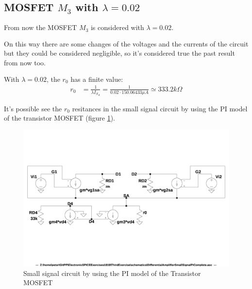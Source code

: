 \documentclass[10pt,a4paper]{book}
\begin{document}
\subsection{MOSFET $M_3$ with $\lambda = 0.02$}
From now the MOSFET $M_3$ is considered with $\lambda = 0.02$.\par
On this way there are some changes of the voltages and the currents of the circuit but they could be considered negligible, so it's considered true the past result from now too.\par
With $\lambda = 0.02$, the $r_0$ has a finite value:\\
\begin{align}
r_0 &= \frac{1}{\lambda I_{S_A}}
= \frac{1}{0.02 \cdot 150.06433 \mu A}
\simeq 333.2k\Omega
\end{align}

It's possible see the $r_0$ resitances in the small signal circuit by using the PI model of the transistor MOSFET (figure \ref{PiComplete}).\par

\begin{figure}[h]
  \centering
  \includegraphics[width=12cm]{schematics/DifferentialAmplifierSmallSignalPiComplete.jpg}
  \caption{Small signal circuit by using the PI model of the Transistor MOSFET}
  \label{PiComplete}
\end{figure}
\end{document}
